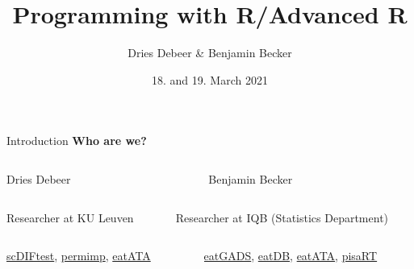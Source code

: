 \documentclass[xcolor=table]{beamer}\usepackage[]{graphicx}\usepackage[]{color}
\begin{document}
\title{Programming with R/Advanced R}


\author[Dries Debeer \& Benjamin Becker]{Dries Debeer \& Benjamin Becker}
\date{18. and 19. March 2021}


\begin{frame}
\titlepage
\end{frame}
\addtocounter{framenumber}{-1}

\begin{frame}{Introduction}
\textbf{Who are we?}

\begin{columns}[t]
\begin{column}{.475\textwidth}
\textcolor{mLightBrown}{Dries Debeer}
\end{column}
  \begin{column}{.475\textwidth}
    \textcolor{mLightBrown}{Benjamin Becker}
  \end{column}
\end{columns}

\begin{columns}[t]
\begin{column}{.475\textwidth}
Researcher at KU Leuven
  	
\end{column}
\begin{column}{.475\textwidth}
Researcher at IQB (Statistics Department)

  \end{column}
\end{columns}

\vspace{0.5cm}

\begin{columns}[t]
\begin{column}{.475\textwidth}
\href{https://github.com/ddebeer/scDIFtest}{scDIFtest}, \href{https://github.com/ddebeer/permimp}{permimp}, \href{https://github.com/beckerbenj/eatATA}{eatATA}
  	
\end{column}
\begin{column}{.475\textwidth}
\href{https://github.com/beckerbenj/eatGADS}{eatGADS}, \href{https://github.com/beckerbenj/eatDB}{eatDB}, \href{https://github.com/beckerbenj/eatATA}{eatATA}, \href{https://github.com/beckerbenj/pisaRT}{pisaRT}

  \end{column}
\end{columns}

\vspace{0.5cm}


\end{frame}
\end{document}
